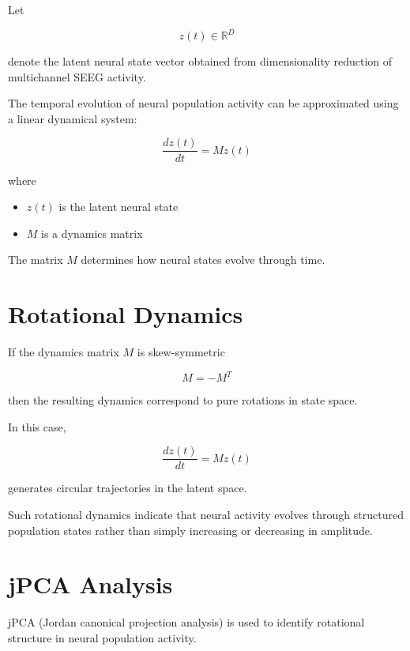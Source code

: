 \documentclass[11pt]{report}
\begin{document}
Let

\begin{equation}
z(t) \in \mathbb{R}^{D}
\end{equation}

denote the latent neural state vector obtained from dimensionality
reduction of multichannel SEEG activity.

The temporal evolution of neural population activity can be
approximated using a linear dynamical system:

\begin{equation}
\frac{dz(t)}{dt} = M z(t)
\end{equation}

where

\begin{itemize}
\item $z(t)$ is the latent neural state
\item $M$ is a dynamics matrix
\end{itemize}

The matrix $M$ determines how neural states evolve through time.

\section{Rotational Dynamics}

If the dynamics matrix $M$ is skew-symmetric

\begin{equation}
M = -M^T
\end{equation}

then the resulting dynamics correspond to pure rotations in state
space.

In this case,

\begin{equation}
\frac{dz(t)}{dt} = M z(t)
\end{equation}

generates circular trajectories in the latent space.

Such rotational dynamics indicate that neural activity evolves
through structured population states rather than simply increasing
or decreasing in amplitude.

\section{jPCA Analysis}

jPCA (Jordan canonical projection analysis) is used to identify
rotational structure in neural population activity.
\end{document}
